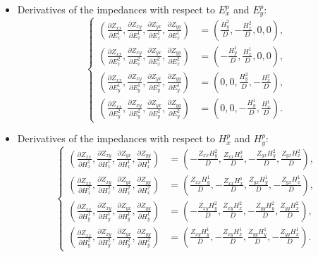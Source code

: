 \documentclass{article}
\begin{document}
\begin{itemize}
\item Derivatives of the impedances with respect to $E_x^p$ and $E_y^p$:
\begin{equation}
\left\{
\begin{aligned}
\left(
\frac{\partial Z_{xx}}{\partial E_x^1},
\frac{\partial Z_{xy}}{\partial E_x^1},
\frac{\partial Z_{yx}}{\partial E_x^1},
\frac{\partial Z_{yy}}{\partial E_x^1}
\right)
&=
\left(
\frac{H_y^2}{D},
-\frac{H_x^2}{D},
0,
0
\right), \\
\left(
\frac{\partial Z_{xx}}{\partial E_x^2},
\frac{\partial Z_{xy}}{\partial E_x^2},
\frac{\partial Z_{yx}}{\partial E_x^2},
\frac{\partial Z_{yy}}{\partial E_x^2}
\right)
&=
\left(
-\frac{H_y^1}{D},
\frac{H_x^1}{D},
0,
0
\right),\\
\left(
\frac{\partial Z_{xx}}{\partial E_y^1},
\frac{\partial Z_{xy}}{\partial E_y^1},
\frac{\partial Z_{yx}}{\partial E_y^1},
\frac{\partial Z_{yy}}{\partial E_y^1}
\right)
&=
\left(
0,
0,
\frac{H_y^2}{D},
-\frac{H_x^2}{D}
\right), \\
\left(
\frac{\partial Z_{xx}}{\partial E_y^2},
\frac{\partial Z_{xy}}{\partial E_y^2},
\frac{\partial Z_{yx}}{\partial E_y^2},
\frac{\partial Z_{yy}}{\partial E_y^2}
\right)
&=
\left(
0,
0,
-\frac{H_y^1}{D},
\frac{H_x^1}{D}
\right).
\end{aligned}
\right.
\end{equation}

\item Derivatives of the impedances with respect to $H_x^p$ and $H_y^p$:
\begin{equation}
\left\{
\begin{aligned}
\left(
\frac{\partial Z_{xx}}{\partial H_x^1},
\frac{\partial Z_{xy}}{\partial H_x^1},
\frac{\partial Z_{yx}}{\partial H_x^1},
\frac{\partial Z_{yy}}{\partial H_x^1}
\right)
&=
\left(
-\frac{Z_{xx}H_y^2}{D},
\frac{Z_{xx}H_x^2}{D},
-\frac{Z_{yx}H_y^2}{D},
\frac{Z_{yx}H_x^2}{D}
\right), \\
\left(
\frac{\partial Z_{xx}}{\partial H_x^2},
\frac{\partial Z_{xy}}{\partial H_x^2},
\frac{\partial Z_{yx}}{\partial H_x^2},
\frac{\partial Z_{yy}}{\partial H_x^2}
\right)
&=
\left(
\frac{Z_{xx}H_y^1}{D},
-\frac{Z_{xx}H_x^1}{D},
\frac{Z_{yx}H_y^1}{D},
-\frac{Z_{yx}H_x^1}{D}
\right),\\
\left(
\frac{\partial Z_{xx}}{\partial H_y^1},
\frac{\partial Z_{xy}}{\partial H_y^1},
\frac{\partial Z_{yx}}{\partial H_y^1},
\frac{\partial Z_{yy}}{\partial H_y^1}
\right)
&=
\left(
-\frac{Z_{xy}H_y^2}{D},
\frac{Z_{xy}H_x^2}{D},
-\frac{Z_{yy}H_y^2}{D},
\frac{Z_{yy}H_x^2}{D}
\right), \\
\left(
\frac{\partial Z_{xx}}{\partial H_y^2},
\frac{\partial Z_{xy}}{\partial H_y^2},
\frac{\partial Z_{yx}}{\partial H_y^2},
\frac{\partial Z_{yy}}{\partial H_y^2}
\right)
&=
\left(
\frac{Z_{xy}H_y^1}{D},
-\frac{Z_{xy}H_x^1}{D},
\frac{Z_{yy}H_y^1}{D},
-\frac{Z_{yy}H_x^1}{D}
\right).
\end{aligned}
\right.
\end{equation}
\end{itemize}
\end{document}
